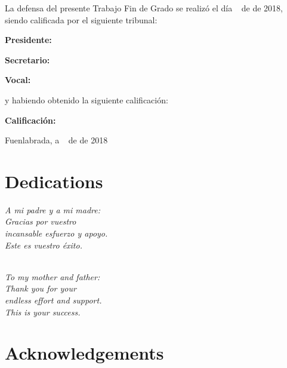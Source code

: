 \documentclass[a4paper, 12pt]{book}
\begin{document}
\vspace{1cm}
La defensa del presente Trabajo Fin de Grado se realizó el día \qquad$\;\,$ de \qquad\qquad\qquad\qquad \newline de 2018, siendo calificada por el siguiente tribunal:


\vspace{0.5cm}
\textbf{Presidente:}

\vspace{1.2cm}
\textbf{Secretario:}

\vspace{1.2cm}
\textbf{Vocal:}


\vspace{1.2cm}
y habiendo obtenido la siguiente calificación:

\vspace{1cm}
\textbf{Calificación:}


\vspace{1cm}
\begin{flushright}
Fuenlabrada, a \qquad$\;\,$ de \qquad\qquad\qquad\qquad de 2018
\end{flushright}


\chapter*{Dedications}
\begin{flushright}
\textit{A mi padre y a mi madre:\\
Gracias por vuestro\\
incansable esfuerzo y apoyo.\\
Este es vuestro éxito.\\}
\end{flushright}
\begin{flushright}
\textit{\\To my mother and father:\\
Thank you for your\\
endless effort and support.\\
This is your success.}
\end{flushright}

\chapter*{Acknowledgements}
\end{document}
